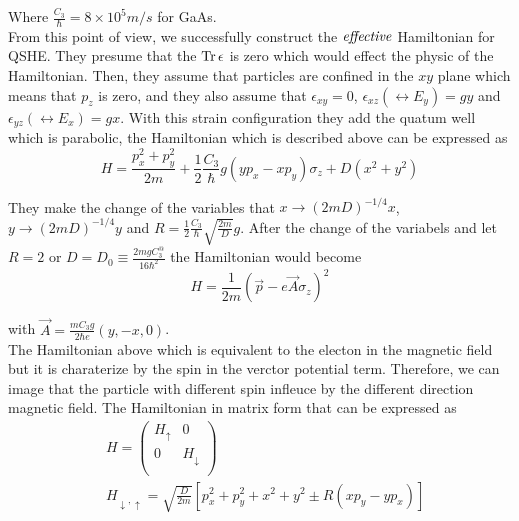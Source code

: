 \documentclass[12pt,a4paper]{article}
\begin{document}
\noindent
Where $\frac{C_3}{\hbar} = 8 \times 10^5 m/s$ for GaAs.\\

From this point of view, we successfully construct the $\it effective$
Hamiltonian for QSHE\@. They presume that the $\Tr \epsilon$ is zero which
would effect the physic of the Hamiltonian. Then, they assume that particles
are confined in the $xy$ plane which means that $p_z$ is zero, and they also
assume that $\epsilon_{xy} = 0$, $\epsilon_{xz}(\leftrightarrow E_y) =g
y$ and $\epsilon_{yz}(\leftrightarrow E_x) = g x$. With this strain
configuration they add the quatum well which is parabolic, the Hamiltonian
which is described above can be expressed as
\begin{equation*}
H= \frac{p_x^2 + p_y^2}{2m} + \frac{1}{2} \frac{C_3}{\hbar}g (y p_x
- x  p_y)\sigma_z + D(x^2 + y^2)
\end{equation*}

\noindent
They make the  change of the variables that
$x \rightarrow (2mD)^{-1/4} x$, $y \rightarrow (2mD)^{-1/4} y$ and $R =
\frac{1}{2} \frac{C_3}{\hbar} \sqrt{\frac{2m}{D}} g$. After the change of
the variabels and let $R = 2$ or $D = D_0\equiv \frac{2mgC_3^@}{16\hbar^2}$
the Hamiltonian would become
\begin{equation*}
  H = \frac{1}{2m} (\vec{p} - e \vec{A} \sigma_z)^2 
\end{equation*}

\noindent
with ${\vec{A} = \frac{m C_3 g}{2 \hbar e}(y, -x, 0)}$.\\

\noindent
The Hamiltonian above which is equivalent to the electon in the magnetic
field but it is charaterize by the spin in the verctor potential term. 
Therefore, we can image that the particle with different spin infleuce by
the different direction magnetic field.
The Hamiltonian in matrix form that can be expressed as 
\begin{eqnarray*}
& H = \left(%
\begin{array}{cc}
  H_{\uparrow} & 0 \\
  0 & H_{\downarrow} \\
\end{array}%
\right) \nonumber\\ & H_{ \downarrow, \uparrow} =
\sqrt{\frac{D}{2m}} [p_x^2 + p_y^2 + x^2+ y^2 \pm R (x p_y - y p_x)]
\end{eqnarray*}
\end{document}
